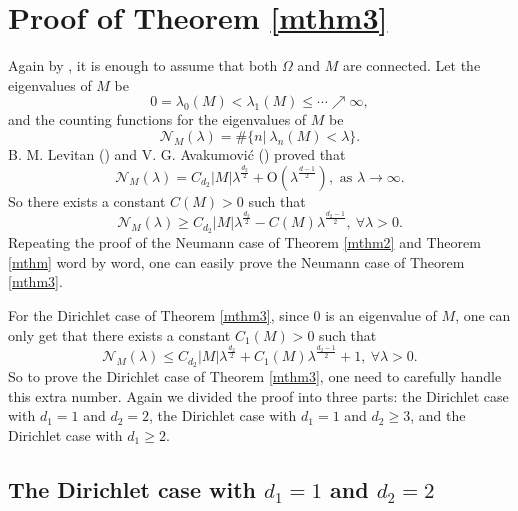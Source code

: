 \documentclass[11pt,letterpaper]{amsart}
\numberwithin{equation}{section}
\theoremstyle{plain}
\theoremstyle{plain}
\numberwithin{equation}{section}
\theoremstyle{remark}
\begin{document}
	\section{Proof of Theorem \ref{mthm3}}		\label{pfmthm3}
	
	Again  by   \cite[Proposition 3.1]{FLP}, it is enough to assume that both $\Omega$ and $M$ are connected. Let the eigenvalues of $M$ be 
	\[
	0=\lambda_0(M)< \lambda_1(M) \leq \cdots\nearrow \infty,
	\]
	and the counting functions for the eigenvalues of $M$ be
	\[
	\mathcal N_M(\lambda)=\#\{n|\ \lambda_n(M)<\lambda\}.
	\]
	B. M. Levitan (\cite{Lev52}) and V. G. Avakumovi{\'c} (\cite{Ava56}) proved that 
	\[
	\mathcal N_M(\lambda)= C_{d_2}|M|\lambda^{\frac{d_2}{2}}+ \mathrm O(\lambda^{\frac{d-1}{2}}), \text{ as }\lambda \to \infty.
	\]
	So there exists a constant $C(M)>0$ such that 
	\begin{equation}\label{MNeu}
		\mathcal N_M(\lambda)\ge C_{d_2}|M|\lambda^{\frac{d_2}{2}}- C(M)\lambda^{\frac{d_2-1}{2}}, \ \forall \lambda>0.
	\end{equation}
	Repeating the proof of the Neumann case of Theorem \ref{mthm2} and Theorem \ref{mthm} word by word, one can easily prove the Neumann case of Theorem \ref{mthm3}.
	
	For the Dirichlet case of Theorem \ref{mthm3}, since 0 is an eigenvalue of $M$, one can only get that there exists a constant $C_1(M)>0$ such that 
	\begin{equation}\label{MDiri}
		\mathcal N_M(\lambda)\le C_{d_2}|M|\lambda^{\frac{d_2}{2}}+ C_1(M)\lambda^{\frac{d_2-1}{2}}+1,\ \forall \lambda>0.
	\end{equation}
	So to prove the Dirichlet case of Theorem \ref{mthm3}, one need to carefully handle this extra number. Again we divided the proof into three parts: the Dirichlet case with $d_1=1$ and $d_2=2$, the Dirichlet case with $d_1=1$ and $d_2\ge 3$, and the Dirichlet case with $d_1\ge 2$.
	
	\subsection{The Dirichlet case with $d_1=1$ and $d_2=2$}
	
\end{document}

